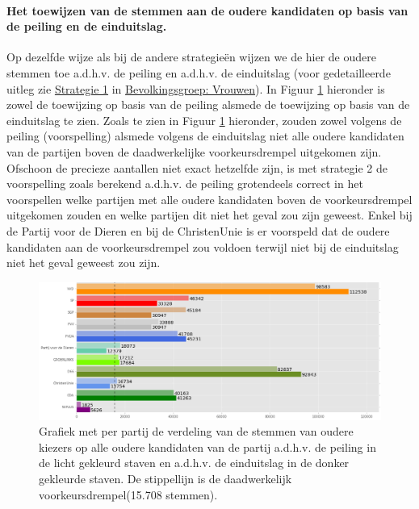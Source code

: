 \paragraph{Het toewijzen van de stemmen aan de oudere kandidaten op basis van de peiling en de einduitslag.}
Op dezelfde wijze als bij de andere strategie\"{e}n wijzen we de hier de oudere stemmen toe a.d.h.v. de peiling en a.d.h.v. de einduitslag (voor gedetailleerde uitleg zie \hyperref[S1V]{Strategie 1} in \hyperref[vrouwen]{Bevolkingsgroep: Vrouwen}). In Figuur \ref{fig:stemmenS2O} hieronder is zowel de toewijzing op basis van de peiling alsmede de toewijzing op basis van de einduitslag te zien.
Zoals te zien in Figuur \ref{fig:stemmenS2O} hieronder, zouden zowel volgens de peiling (voorspelling) alsmede volgens de einduitslag niet alle oudere kandidaten van de partijen boven de daadwerkelijke voorkeursdrempel uitgekomen zijn. Ofschoon de precieze aantallen niet exact hetzelfde zijn, is met strategie 2 de voorspelling zoals berekend a.d.h.v. de peiling grotendeels correct in het voorspellen welke partijen met alle oudere kandidaten boven de voorkeursdrempel uitgekomen zouden en welke partijen dit niet het geval zou zijn geweest. Enkel bij de Partij voor de Dieren en bij de ChristenUnie is er voorspeld dat de oudere kandidaten aan de voorkeursdrempel zou voldoen terwijl niet bij de einduitslag niet het geval geweest zou zijn.

\begin{figure}[H]

	\includegraphics[width=\linewidth]	{stemmen_op_ouderen_willekeurig_samen.png}

			\caption{Grafiek met per partij de verdeling van de stemmen van oudere kiezers op alle oudere kandidaten van de partij a.d.h.v. de peiling \citep{IPSOS} in de licht gekleurd staven en a.d.h.v. de einduitslag \citep{Kiesraad_databank} in de donker gekleurde staven. De stippellijn is de daadwerkelijk voorkeursdrempel(15.708 stemmen).}

\label{fig:stemmenS2O}
\end{figure}

